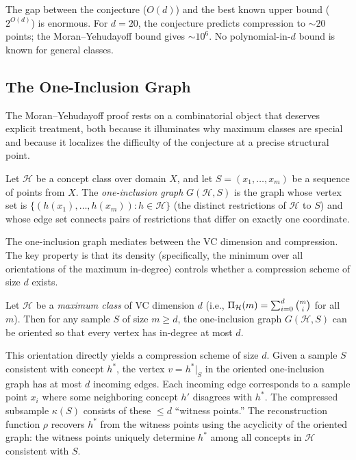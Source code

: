 \begin{remark}
\label{rmk:compression-gap}
The gap between the conjecture ($O(d)$) and the best known upper bound
($2^{O(d)}$) is enormous.  For $d = 20$, the conjecture predicts compression to
$\sim 20$ points; the Moran--Yehudayoff bound gives $\sim 10^6$.  No
polynomial-in-$d$ bound is known for general classes.
\end{remark}

\subsection{The One-Inclusion Graph}
\label{sec:one-inclusion}

The Moran--Yehudayoff proof rests on a combinatorial object that deserves
explicit treatment, both because it illuminates why maximum classes are
special and because it localizes the difficulty of the conjecture at a
precise structural point.

\begin{defn}
\label{def:one-inclusion-graph}
Let $\mathcal{H}$ be a concept class over domain $X$, and let
$S = (x_1, \ldots, x_m)$ be a sequence of points from $X$.  The
\emph{one-inclusion graph} $G(\mathcal{H}, S)$ is the graph whose
vertex set is
$\{(h(x_1), \ldots, h(x_m)) : h \in \mathcal{H}\}$
(the distinct restrictions of $\mathcal{H}$ to $S$)
and whose edge set connects pairs of restrictions that differ on
exactly one coordinate.
\end{defn}

The one-inclusion graph mediates between the VC dimension and
compression.  The key property is that its density (specifically, the
minimum over all orientations of the maximum in-degree) controls
whether a compression scheme of size $d$ exists.

\begin{thm}
\label{thm:one-inclusion-orientation}
Let $\mathcal{H}$ be a \emph{maximum class} of VC dimension $d$
(i.e., $\Pi_\mathcal{H}(m) = \sum_{i=0}^d \binom{m}{i}$ for all
$m$).  Then for any sample $S$ of size $m \geq d$, the one-inclusion
graph $G(\mathcal{H}, S)$ can be oriented so that every vertex has
in-degree at most $d$.
\end{thm}

This orientation directly yields a compression scheme of size $d$.
Given a sample $S$ consistent with concept $h^*$, the vertex
$v = h^*|_S$ in the oriented one-inclusion graph has at most $d$
incoming edges.  Each incoming edge corresponds to a sample point
$x_i$ where some neighboring concept $h'$ disagrees with $h^*$.
The compressed subsample $\kappa(S)$ consists of these $\leq d$
``witness points.''  The reconstruction function $\rho$ recovers
$h^*$ from the witness points using the acyclicity of the oriented
graph: the witness points uniquely determine $h^*$ among all
concepts in $\mathcal{H}$ consistent with $S$.

